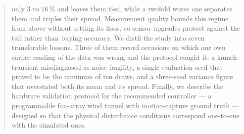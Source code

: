 \begin{abstract}
only $3$ to $16\,\%$ and leaves them tied, while a twofold worse one separates them and
triples their spread. Measurement quality bounds this regime from above without setting
its floor, so sensor upgrades protect against the tail rather than buying accuracy. We
distil the study into seven transferable lessons. Three of them record occasions on
which our own earlier reading of the data was wrong and the protocol caught it: a launch
transient misdiagnosed as noise fragility, a single evaluation seed that proved to be the
minimum of ten draws, and a three-seed variance figure that overstated both its mean and
its spread. Finally, we describe the hardware
validation protocol for the recommended controller --- a programmable fan-array wind
tunnel with motion-capture ground truth --- designed so that the physical disturbance
conditions correspond one-to-one with the simulated ones.
\end{abstract}

